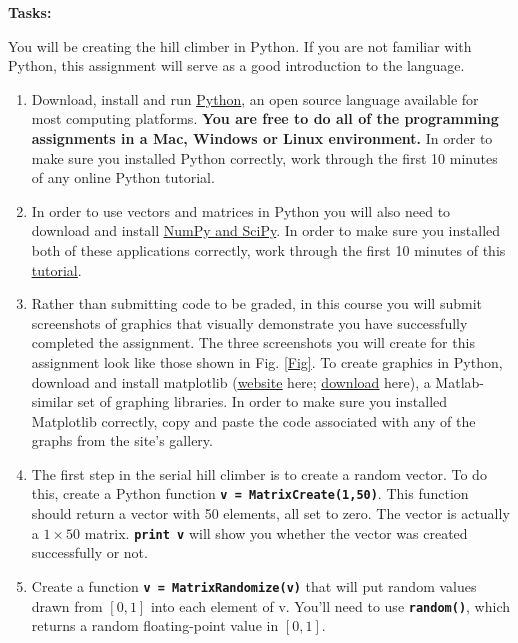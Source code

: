 \documentclass[12pt]{article}
\begin{document}
\noindent \textbf{Tasks:}

You will be creating the hill climber in Python. If you are not familiar with Python, this assignment will serve as a good introduction to the language.

\begin{enumerate}

\item Download, install and run \href{http://www.python.org/}{\underline{Python}}, an open source language available for most computing platforms. \textbf{You are free to do all of the programming assignments in a Mac, Windows or Linux environment.} In order to make sure you installed Python correctly, work through the first 10 minutes of any online Python tutorial.

\item In order to use vectors and matrices in Python you will also need to download and install \href{http://numpy.scipy.org/}{\underline{NumPy and SciPy}}. In order to make sure you installed both of these applications correctly, work through the first 10 minutes of this \href{http://www.scipy.org/Tentative_NumPy_Tutorial}{\underline{tutorial}}.

\item Rather than submitting code to be graded, in this course you will submit screenshots of graphics that visually demonstrate you have successfully completed the assignment. The three screenshots you will create for this assignment look like those shown in Fig. \ref{Fig}. To create graphics in Python, download and install matplotlib
    (\href{http://matplotlib.sourceforge.net/}
    {\underline{website}} here;
    \href{http://sourceforge.net/projects/matplotlib/files/matplotlib/matplotlib-1.0/}
    {\underline{download}} here),
    a Matlab-similar set of graphing libraries. In order to make sure you installed Matplotlib correctly, copy and paste the code associated with any of the graphs from the site's gallery.

\item The first step in the serial hill climber is to create a random vector. To do this, create a Python function \textbf{\texttt{v = MatrixCreate(1,50)}}. This function should return a vector with 50 elements, all set to zero. The vector is actually a $1 \times 50$ matrix. \textbf{\texttt{print v}} will show you whether the vector was created successfully or not.

\item Create a function \textbf{\texttt{v = MatrixRandomize(v)}} that will put random values drawn from $[0,1]$ into each element of v. You'll need to use \textbf{\texttt{random()}}, which returns a random floating-point value in $[0,1]$.


\end{enumerate}
\end{document}
